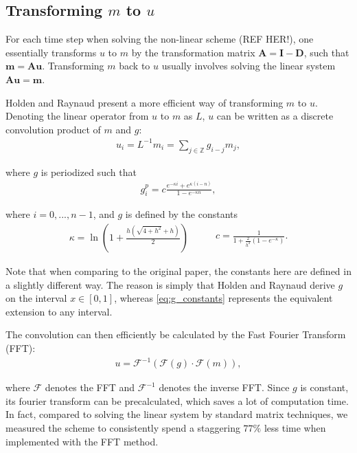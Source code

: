 \subsection*{Transforming $m$ to $u$}

For each time step when solving the non-linear scheme (REF HER!), one essentially transforms $u$ to $m$ by the transformation matrix $\bm{A} = \bm{I - D}$, such that $\bm{m} = \bm{Au}$. Transforming $m$ back to $u$ usually involves solving the linear system $\bm{Au} = \bm{m}$. 

Holden and Raynaud \cite{holden2006convergence} present a more efficient way of transforming $m$ to $u$. Denoting the linear operator from $u$ to $m$ as $L$, $u$ can be written as a discrete convolution product of $m$ and $g$:
\begin{align*}
u_i = L^{-1} m_i = \sum\limits_{j \in \mathds{Z}} g_{i - j} m_j,
\end{align*}

where $g$ is periodized such that
\begin{align*}
g_i^p = c \frac{e^{-\kappa i} + e^{\kappa (i - n)}}{1 - e^{-\kappa n}},
\end{align*}

where $i = 0, ..., n - 1$, and $g$ is defined by the constants
\begin{equation}
\label{eq:g_constants}
\begin{aligned}
\kappa = \ln \left( 1 + \frac{h(\sqrt{4 + h^2} + h)}{2} \right)
\end{aligned}
\qquad
\begin{aligned}
c = \frac{1}{1 + \frac{2}{h^2} (1 - e^{-\kappa})}.
\end{aligned}
\end{equation}

Note that when comparing to the original paper, the constants here are defined in a slightly different way. The reason is simply that Holden and Raynaud derive $g$ on the interval $x \in [0, 1]$, whereas \eqref{eq:g_constants} represents the equivalent extension to any interval.

The convolution can then efficiently be calculated by the Fast Fourier Transform (FFT):
\begin{align*}
u = \mathcal{F}^{-1} (\mathcal{F} (g) \cdot \mathcal{F}(m)),
\end{align*}

where $\mathcal{F}$ denotes the FFT and $\mathcal{F}^{-1}$ denotes the inverse FFT. Since $g$ is constant, its fourier transform can be precalculated, which saves a lot of computation time. In fact, compared to solving the linear system by standard matrix techniques, we measured the scheme to consistently spend a staggering $77\%$ less time when implemented with the FFT method.

